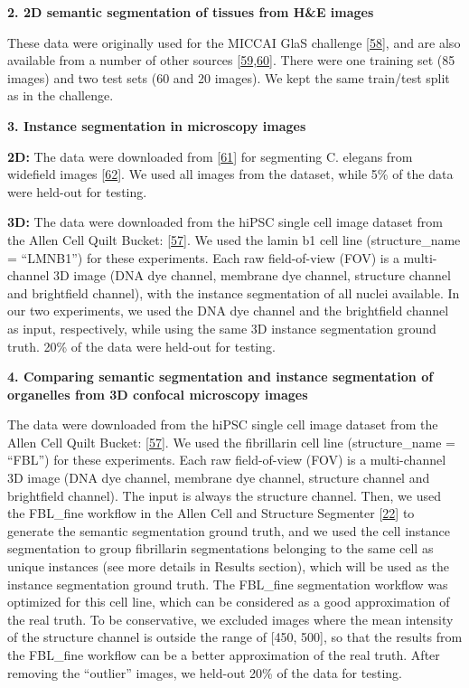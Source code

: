 \textbf{2. 2D semantic segmentation of tissues from H\&E images}

These data were originally used for the MICCAI GlaS challenge {[}\protect\hyperlink{ref-ZmNLyDRf}{58}{]}, and are also available from a number of other sources {[}\protect\hyperlink{ref-GCuzvG4m}{59},\protect\hyperlink{ref-1ClIGtR4D}{60}{]}. There were one training set (85 images) and two test sets (60 and 20 images). We kept the same train/test split as in the challenge.

\textbf{3. Instance segmentation in microscopy images}

\textbf{2D:} The data were downloaded from {[}\protect\hyperlink{ref-zvJ4kB9e}{61}{]} for segmenting C. elegans from widefield images {[}\protect\hyperlink{ref-wJGDcP0t}{62}{]}. We used all images from the dataset, while 5\% of the data were held-out for testing.

\textbf{3D:} The data were downloaded from the hiPSC single cell image dataset from the Allen Cell Quilt Bucket: {[}\protect\hyperlink{ref-vm45dW9e}{57}{]}. We used the lamin b1 cell line (structure\_name = ``LMNB1'') for these experiments. Each raw field-of-view (FOV) is a multi-channel 3D image (DNA dye channel, membrane dye channel, structure channel and brightfield channel), with the instance segmentation of all nuclei available. In our two experiments, we used the DNA dye channel and the brightfield channel as input, respectively, while using the same 3D instance segmentation ground truth. 20\% of the data were held-out for testing.

\textbf{4. Comparing semantic segmentation and instance segmentation of organelles from 3D confocal microscopy images}

The data were downloaded from the hiPSC single cell image dataset from the Allen Cell Quilt Bucket: {[}\protect\hyperlink{ref-vm45dW9e}{57}{]}. We used the fibrillarin cell line (structure\_name = ``FBL'') for these experiments. Each raw field-of-view (FOV) is a multi-channel 3D image (DNA dye channel, membrane dye channel, structure channel and brightfield channel). The input is always the structure channel. Then, we used the FBL\_fine workflow in the Allen Cell and Structure Segmenter {[}\protect\hyperlink{ref-jM3v1UjQ}{22}{]} to generate the semantic segmentation ground truth, and we used the cell instance segmentation to group fibrillarin segmentations belonging to the same cell as unique instances (see more details in Results section), which will be used as the instance segmentation ground truth. The FBL\_fine segmentation workflow was optimized for this cell line, which can be considered as a good approximation of the real truth. To be conservative, we excluded images where the mean intensity of the structure channel is outside the range of {[}450, 500{]}, so that the results from the FBL\_fine workflow can be a better approximation of the real truth. After removing the ``outlier'' images, we held-out 20\% of the data for testing.

